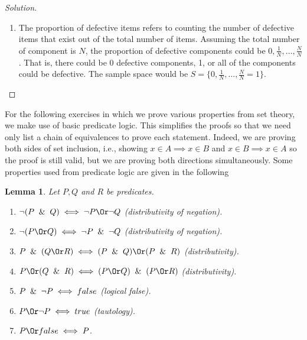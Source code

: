 \documentclass[12pt]{article}
\theoremstyle{definition}
\theoremstyle{plain}
\newtheorem*{lemma*}{Lemma}
\newenvironment{solution}
  {\begin{proof}[Solution]}
  {\end{proof}}
\begin{document}
\begin{enumerate}
\begin{solution}
\begin{enumerate}
	\item The proportion of defective items refers to counting the number of defective items that exist out of the total number of items. Assuming the total number of component is $ N $, the proportion of defective components could be $ 0, \frac{1}{N}, \ldots, \frac{N}{N} $. That is, there could be $ 0 $ defective components, 1, or all of the components could be defective. The sample space would be $ S = \{ 0, \frac{1}{N}, \ldots, \frac{N}{N} = 1 \} $.
\end{enumerate}
\end{solution}
	
For the following exercises in which we prove various properties from set theory, we make use of basic predicate logic. This simplifies the proofs so that we need only list a chain of equivalences to prove each statement. Indeed, we are proving both sides of set inclusion, i.e., showing $ x \in A \implies x \in B $ and $ x \in B \implies x \in A $ so the proof is still valid, but we are proving both directions simultaneously. Some properties used from predicate logic are given in the following

\begin{lemma*}
Let $ P, Q$ and $ R $ be predicates.
\begin{enumerate}
\item $ \neg (P \And Q) \iff \neg P \Or \neg Q $ (distributivity of negation).
\item $ \neg (P \Or Q) \iff \neg P \And \neg Q $ (distributivity of negation).
\item $ P \And (Q \Or R) \iff (P \And Q) \Or (P \And R) $ (distributivity).
\item $ P \Or (Q \And R) \iff (P \Or Q) \And (P \Or R) $ (distributivity).
\item $ P \And \neg P \iff false$ (logical false).
\item $ P \Or \neg P \iff true $ (tautology).
\item $ P \Or false \iff P $.
\end{enumerate}
\end{lemma*}
	

\end{enumerate}
\end{document}
